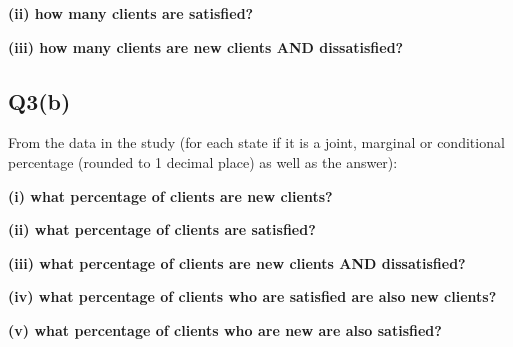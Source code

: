\documentclass[
  11pt,
  oneside]{scrbook}
\begin{document}
\begin{answerbox}\vspace{1.5cm}\end{answerbox}

\textbf{(ii) how many clients are satisfied? }

\begin{answerbox}\vspace{1.5cm}\end{answerbox}

\textbf{(iii) how many clients are new clients AND dissatisfied?}

\begin{answerbox}\vspace{1.5cm}\end{answerbox}

\subsection*{Q3(b)}\label{q3b}

From the data in the study (for each state if it is a joint, marginal or conditional
percentage (rounded to 1 decimal place) as well as the answer):

\textbf{(i) what percentage of clients are new clients?}

\begin{answerbox}\vspace{1.5cm}\end{answerbox}

\textbf{(ii) what percentage of clients are satisfied?}

\begin{answerbox}\vspace{1.5cm}\end{answerbox}

\textbf{(iii) what percentage of clients are new clients AND dissatisfied?}

\begin{answerbox}\vspace{1.5cm}\end{answerbox}

\textbf{(iv)    what percentage of clients who are satisfied are also new clients?}

\begin{answerbox}\vspace{1.5cm}\end{answerbox}

\textbf{(v) what percentage of clients who are new are also satisfied?}
\end{document}
